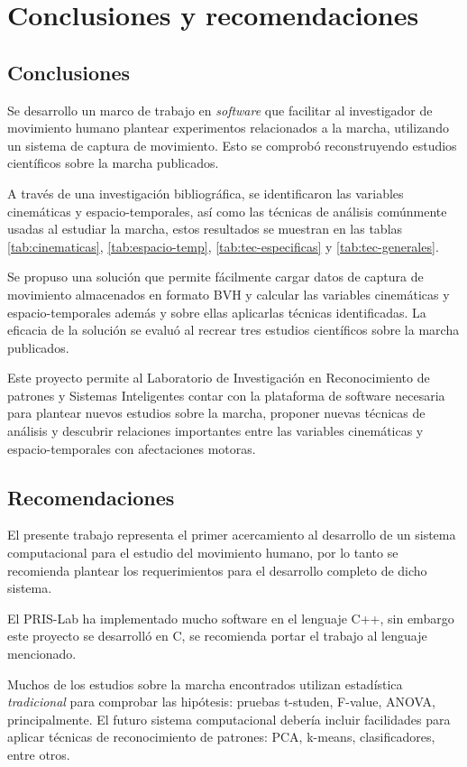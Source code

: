 \chapter{Conclusiones y recomendaciones}

\section{Conclusiones}

Se desarrollo un marco de trabajo en \emph{software} que facilitar al investigador de movimiento humano plantear experimentos relacionados a la marcha, utilizando un sistema de captura de movimiento. Esto se comprobó reconstruyendo estudios científicos sobre la marcha publicados.

A través de una investigación bibliográfica, se identificaron las variables cinemáticas y espacio-temporales, así como las técnicas de análisis comúnmente usadas al estudiar la marcha, estos resultados se muestran en las tablas \ref{tab:cinematicas}, \ref{tab:espacio-temp}, \ref{tab:tec-especificas} y \ref{tab:tec-generales}.

Se propuso una solución que permite fácilmente cargar datos de captura de movimiento almacenados en formato BVH y calcular las variables cinemáticas y espacio-temporales además y sobre ellas aplicarlas técnicas identificadas. La eficacia de la solución se evaluó al recrear tres estudios científicos sobre la marcha publicados.

Este proyecto permite al Laboratorio de Investigación en Reconocimiento de patrones y Sistemas Inteligentes contar con la plataforma de software necesaria para plantear nuevos estudios sobre la marcha, proponer nuevas técnicas de análisis y descubrir relaciones importantes entre las variables cinemáticas y espacio-temporales con afectaciones motoras. 


\section{Recomendaciones}

El presente trabajo representa el primer acercamiento al desarrollo de un sistema computacional para el estudio del movimiento humano, por lo tanto se recomienda plantear los requerimientos para el desarrollo completo de dicho sistema. 

El PRIS-Lab ha implementado mucho software en el lenguaje C++, sin embargo este proyecto se desarrolló en C, se recomienda portar el trabajo al lenguaje mencionado.

Muchos de los estudios sobre la marcha encontrados utilizan estadística \emph{tradicional} para comprobar las hipótesis: pruebas t-studen, F-value, ANOVA, principalmente. El futuro sistema computacional debería incluir facilidades para aplicar técnicas de reconocimiento de patrones: PCA, k-means, clasificadores, entre otros. 


